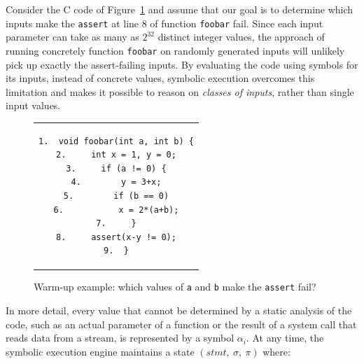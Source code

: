 Consider the C code of Figure~\ref{fig:example-1} and assume that our goal is to determine which inputs make the  {\tt assert} at line 8 of function \texttt{foobar} fail. Since each input parameter can take as many as $2^{32}$ distinct integer values, the approach of running concretely function \texttt{foobar} on randomly generated inputs will unlikely pick up exactly the assert-failing inputs.
By evaluating the code using symbols for its inputs, instead of concrete values, symbolic execution overcomes this limitation and makes it possible to reason on {\em classes of inputs}, rather than single input values. 

\begin{figure}[t]
\begin{center}
\begin{tabular}{c}
\begin{lstlisting}[basicstyle=\ttfamily\scriptsize]
1.  void foobar(int a, int b) {
2.     int x = 1, y = 0;
3.     if (a != 0) {
4.        y = 3+x;
5.        if (b == 0)
6.           x = 2*(a+b);
7.     }
8.     assert(x-y != 0);
9.  }
\end{lstlisting}
\end{tabular}
\end{center}
\vspace{-2mm}
\caption{Warm-up example: which values of \texttt{a} and \texttt{b} make the \texttt{assert} fail?}
\label{fig:example-1}
\end{figure}

In more detail, every value that cannot be determined by a static analysis of the code, such as an actual parameter of a function or the result of a system call that reads data from a stream, is represented by a symbol $\alpha_i$. At any time, the symbolic execution engine maintains a state $(stmt,~\sigma,~\pi)$ where:


